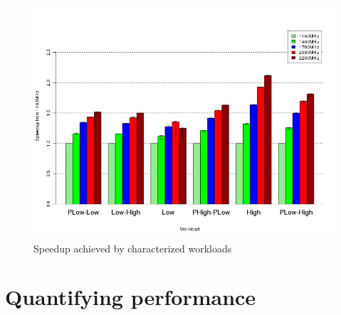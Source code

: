 \begin{figure}[h!]
  \begin{center}
    \includegraphics[height=3.5in]{figures/group_speedup.jpg}
    \caption{Speedup achieved by characterized workloads}
    \label{fig:group_speedup}
  \end{center}
\end{figure}

\section{Quantifying performance}~\label{sec:quant_perf}

